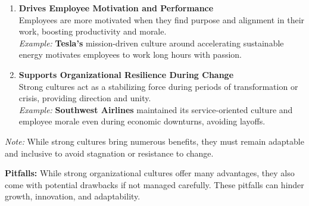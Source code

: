 \documentclass[10pt,a4paper]{book}
\begin{document}
\begin{enumerate}
    \item \textbf{Drives Employee Motivation and Performance} \\
    Employees are more motivated when they find purpose and alignment in their work, boosting productivity and morale.\\
    \textit{Example:} \textbf{Tesla’s} mission-driven culture around accelerating sustainable energy motivates employees to work long hours with passion.

    \item \textbf{Supports Organizational Resilience During Change} \\
    Strong cultures act as a stabilizing force during periods of transformation or crisis, providing direction and unity.\\
    \textit{Example:} \textbf{Southwest Airlines} maintained its service-oriented culture and employee morale even during economic downturns, avoiding layoffs.
\end{enumerate}

\textit{Note:} While strong cultures bring numerous benefits, they must remain adaptable and inclusive to avoid stagnation or resistance to change.

\vspace{1cm}

\textbf{Pitfalls:}
While strong organizational cultures offer many advantages, they also come with potential drawbacks if not managed carefully. These pitfalls can hinder growth, innovation, and adaptability.
\end{document}
